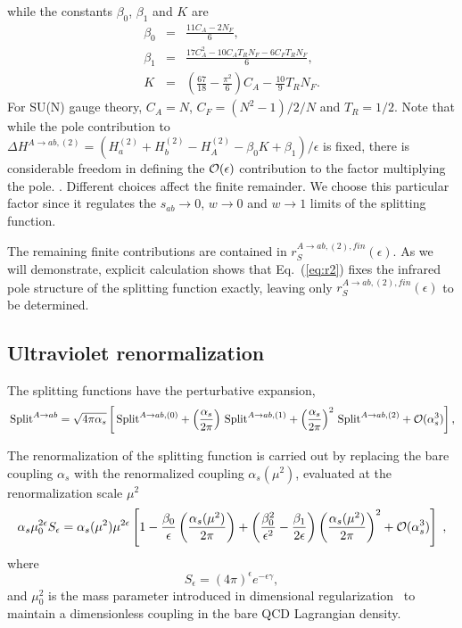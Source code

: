 \documentclass[paper,notoc,nohyper]{JHEP3}
\def\e{\epsilon}
\def\Split{\, {\rm Split}}
\def\CA{C_A}
\def\CF{C_F}
\def\NF{N_F}
\def\e{\epsilon}
\begin{document}
while the constants $\beta_0$, $\beta_1$ and $K$ are
\begin{eqnarray}
\beta_0 &=& \frac{11\CA-2N_F}{6},\\
\beta_1 &=& \frac{17\CA^2-10\CA T_R\NF-6\CF T_R\NF}{6},\\
K &=& \left( \frac{67}{18} - \frac{\pi^2}{6} \right) \CA -  \frac{10}{9} T_R \NF.
\end{eqnarray}
For SU(N) gauge theory, $\CA = N$, $\CF = (N^2-1)/2/N$ and $T_R = 1/2$.
Note that while the pole contribution to $\Delta H^{A \to ab,(2)} = \left(H^{(2)}_a+H^{(2)}_b-H^{(2)}_A -\beta_0 K
+\beta_1\right)/\e$ is fixed,
there is considerable freedom in defining the ${\cal O}(\e) $ contribution to 
the factor multiplying the pole.
.  Different choices affect the finite remainder.
We choose this particular factor since it regulates the
$s_{ab} \to 0$, $w \to 0$ and $w \to 1$ limits of the splitting function.

The remaining finite contributions are contained in $r_{S}^{A \to ab,(2),fin}(\e)$. As we will demonstrate,
explicit calculation shows that Eq.~(\ref{eq:r2}) fixes the infrared pole structure of the splitting
function exactly, leaving only $r_{S}^{A \to ab,(2),fin}(\e)$ to be determined.

\subsection{Ultraviolet renormalization}
\label{subsec:renorm}

The splitting functions have the perturbative expansion,
\begin{equation}
\Split^{A \to ab}  = \sqrt{4\pi\alpha_s}\left[
\Split^{A \to ab,(0)}  
+ \left(\frac{\alpha_s}{2\pi}\right) \Split^{A \to ab,(1)}  
+ \left(\frac{\alpha_s}{2\pi}\right)^2 \Split^{A \to ab,(2)} 
+ {\cal O}(\alpha_s^3) \right],
\end{equation}

The renormalization of the splitting function is carried out by replacing 
the bare coupling $\alpha_s$ with the renormalized coupling 
$\alpha_s(\mu^2)$,
evaluated at the renormalization scale $\mu^2$
\begin{equation}
\alpha_s\mu_0^{2\e} S_\e = \alpha_s(\mu^2) \mu^{2\e}\left[
1- \frac{\beta_0}{\e}\left(\frac{\alpha_s(\mu^2)}{2\pi}\right) 
+\left(\frac{\beta_0^2}{\e^2}-\frac{\beta_1}{2\e}\right)
\left(\frac{\alpha_s(\mu^2)}{2\pi}\right)^2+{\cal O}(\alpha_s^3) \right]\; ,
\end{equation}
where
\begin{displaymath}
S_\e =(4\pi)^\e e^{-\e\gamma},
\end{displaymath}
and $\mu_0^2$ is the mass parameter introduced 
in dimensional regularization~\cite{dreg1,dreg2,'tHooft:renorm} to maintain a 
dimensionless coupling 
in the bare QCD Lagrangian density.
\end{document}
